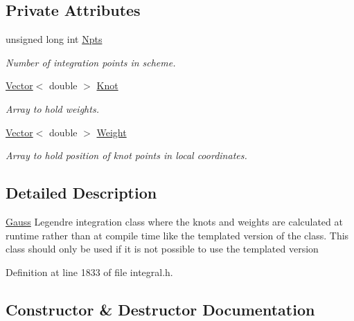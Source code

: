 \subsection*{Private Attributes}
\begin{DoxyCompactItemize}
\item 
unsigned long int \hyperlink{classoomph_1_1RuntimeCalculatedGaussLegendre_a3d6d54efb113cac80524fa3466847bb7}{Npts}
\begin{DoxyCompactList}\small\item\em Number of integration points in scheme. \end{DoxyCompactList}\item 
\hyperlink{classoomph_1_1Vector}{Vector}$<$ double $>$ \hyperlink{classoomph_1_1RuntimeCalculatedGaussLegendre_a9fb3def42d11c280d2de76261fea8f5d}{Knot}
\begin{DoxyCompactList}\small\item\em Array to hold weights. \end{DoxyCompactList}\item 
\hyperlink{classoomph_1_1Vector}{Vector}$<$ double $>$ \hyperlink{classoomph_1_1RuntimeCalculatedGaussLegendre_a55a8b5efd6e88145ab43e59f66795a2d}{Weight}
\begin{DoxyCompactList}\small\item\em Array to hold position of knot points in local coordinates. \end{DoxyCompactList}\end{DoxyCompactItemize}


\subsection{Detailed Description}
\hyperlink{classoomph_1_1Gauss}{Gauss} Legendre integration class where the knots and weights are calculated at runtime rather than at compile time like the templated version of the class. This class should only be used if it is not possible to use the templated version 

Definition at line 1833 of file integral.\+h.



\subsection{Constructor \& Destructor Documentation}
\mbox{\label{classoomph_1_1RuntimeCalculatedGaussLegendre_abf49398d75b7a03f1a079a375acf4683}} 
